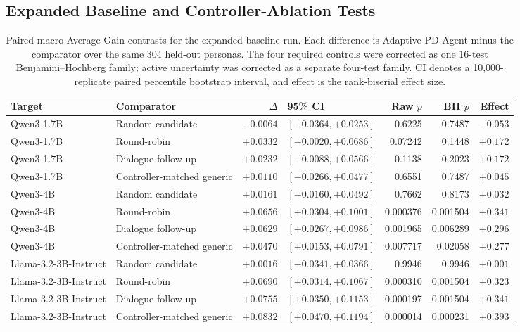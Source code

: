 \documentclass{ieeeaccess}
\begin{document}
\subsection{Expanded Baseline and Controller-Ablation Tests}
\renewcommand{\thetable}{S8}
\begin{table}[H]
\centering
\footnotesize
\setlength{\tabcolsep}{3pt}
\caption{Paired macro Average Gain contrasts for the expanded baseline run. Each difference is
Adaptive PD-Agent minus the comparator over the same 304 held-out personas. The four required
controls were corrected as one 16-test Benjamini--Hochberg family; active uncertainty was
corrected as a separate four-test family. CI denotes a 10,000-replicate paired percentile
bootstrap interval, and effect is the rank-biserial effect size.}
\label{tab:stronger-baselines}
\begin{tabularx}{\textwidth}{l l r X r r r}
\toprule
Target & Comparator & $\Delta$ & 95\% CI & Raw $p$ & BH $p$ & Effect \\
\midrule
Qwen3-1.7B & Random candidate & $-0.0064$ & $[-0.0364,+0.0253]$ & 0.6225 & 0.7487 & $-0.053$ \\
Qwen3-1.7B & Round-robin & $+0.0332$ & $[-0.0020,+0.0686]$ & 0.07242 & 0.1448 & $+0.172$ \\
Qwen3-1.7B & Dialogue follow-up & $+0.0232$ & $[-0.0088,+0.0566]$ & 0.1138 & 0.2023 & $+0.172$ \\
Qwen3-1.7B & Controller-matched generic & $+0.0110$ & $[-0.0266,+0.0477]$ & 0.6551 & 0.7487 & $+0.045$ \\
Qwen3-4B & Random candidate & $+0.0161$ & $[-0.0160,+0.0492]$ & 0.7662 & 0.8173 & $+0.032$ \\
Qwen3-4B & Round-robin & $+0.0656$ & $[+0.0304,+0.1001]$ & 0.000376 & 0.001504 & $+0.341$ \\
Qwen3-4B & Dialogue follow-up & $+0.0629$ & $[+0.0267,+0.0986]$ & 0.001965 & 0.006289 & $+0.296$ \\
Qwen3-4B & Controller-matched generic & $+0.0470$ & $[+0.0153,+0.0791]$ & 0.007717 & 0.02058 & $+0.277$ \\
Llama-3.2-3B-Instruct & Random candidate & $+0.0016$ & $[-0.0341,+0.0366]$ & 0.9946 & 0.9946 & $+0.001$ \\
Llama-3.2-3B-Instruct & Round-robin & $+0.0690$ & $[+0.0314,+0.1067]$ & 0.000310 & 0.001504 & $+0.323$ \\
Llama-3.2-3B-Instruct & Dialogue follow-up & $+0.0755$ & $[+0.0350,+0.1153]$ & 0.000197 & 0.001504 & $+0.341$ \\
Llama-3.2-3B-Instruct & Controller-matched generic & $+0.0832$ & $[+0.0470,+0.1194]$ & 0.000014 & 0.000231 & $+0.393$ \\

\end{tabularx}
\end{table}
\end{document}
